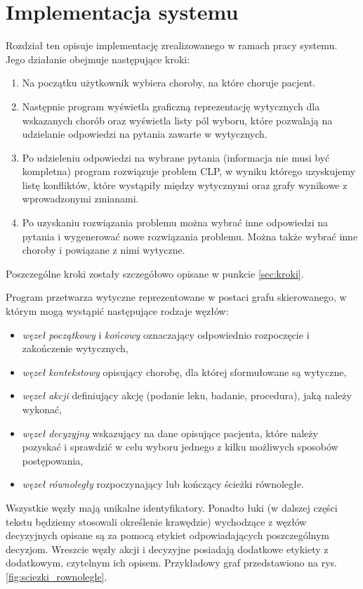\chapter{Implementacja systemu}

Rozdział ten opisuje implementację zrealizowanego w ramach pracy systemu. Jego działanie obejmuje następujące kroki: 
\begin{enumerate}
\item Na początku użytkownik wybiera choroby, na które choruje pacjent. 
\item Następnie program wyświetla graficzną reprezentację wytycznych dla wskazanych chorób oraz wyświetla listy pól wyboru, które pozwalają na udzielanie odpowiedzi na pytania zawarte w wytycznych. 
\item Po udzieleniu odpowiedzi na wybrane pytania (informacja nie musi być kompletna) program rozwiązuje problem CLP, w wyniku którego uzyskujemy listę konfliktów, które wystąpiły między wytycznymi oraz grafy wynikowe z wprowadzonymi zmianami. 
\item Po uzyskaniu rozwiązania problemu można wybrać inne odpowiedzi na pytania i wygenerować nowe rozwiązania problemu. Można także wybrać inne choroby i powiązane z nimi wytyczne.
\end{enumerate}
Poszczególne kroki zostały szczegółowo opisane w punkcie \ref{sec:kroki}. 

Program przetwarza wytyczne reprezentowane w postaci grafu skierowanego, w którym mogą wystąpić następujące rodzaje węzłów:
\begin{itemize}
\item \textit{węzeł początkowy} i \textit{końcowy} oznaczający odpowiednio rozpoczęcie i zakończenie wytycznych,
\item \textit{węzeł kontekstowy} opisujący chorobę, dla której sformułowane są wytyczne,
\item \textit{węzeł akcji} definiujący akcję (podanie leku, badanie, procedura), jaką należy wykonać,
\item \textit{węzeł decyzyjny} wskazujący na dane opisujące pacjenta, które należy pozyskać i sprawdzić w celu wyboru jednego z kilku możliwych sposobów postępowania,
\item \textit{węzeł równoległy} rozpoczynający lub kończący ścieżki równoległe.
\end{itemize}

Wszystkie węzły mają unikalne identyfikatory. Ponadto łuki (w dalszej części tekstu będziemy stosowali określenie krawędzie) wychodzące z węzłów decyzyjnych opisane są za pomocą etykiet odpowiadających poszczególnym decyzjom. Wreszcie węzły akcji i decyzyjne posiadają dodatkowe etykiety z dodatkowym, czytelnym ich opisem. Przykładowy graf przedstawiono na rys. \ref{fig:sciezki_rownolegle}. 

